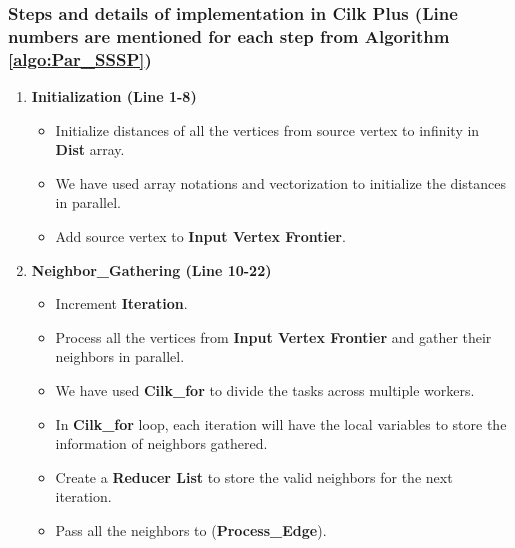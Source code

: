 \documentclass{article}
\begin{document}
\subsubsection{Steps and details of implementation in Cilk Plus (Line numbers are mentioned for each step from Algorithm \ref{algo:Par_SSSP})} 

\begin{enumerate}


\item \textbf{Initialization (Line 1-8)}
\begin{itemize}
\item Initialize distances of all the vertices from source vertex to infinity in \textbf{Dist} array.\\
\item We have used array notations and vectorization to initialize the distances in parallel. \\
\item Add source vertex to \textbf{Input Vertex Frontier}. \\
\end{itemize}


\item \textbf{Neighbor\_Gathering (Line 10-22)}
\begin{itemize}
\item Increment \textbf{Iteration}. \\
\item Process all the vertices from \textbf{Input Vertex Frontier} and gather their neighbors in parallel. \\
\item We have used \textbf{Cilk\_for} to divide the tasks across multiple workers. \\
\item In \textbf{Cilk\_for} loop, each iteration will have the local variables to store the information of neighbors gathered. \\
\item Create a \textbf{Reducer List} to store the valid neighbors for the next iteration. \\
\item Pass all the neighbors to (\textbf{Process\_Edge}).  \\
\end{itemize}



\end{enumerate}
\end{document}
